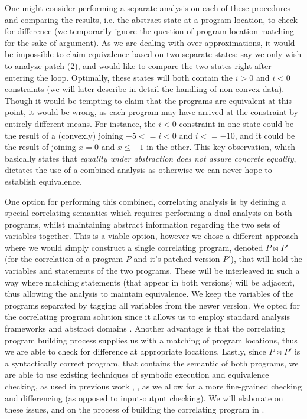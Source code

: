 One might consider performing a separate analysis on each of these procedures and comparing the results, i.e. the abstract state at a program location, to check for difference (we temporarily ignore the question of program location matching for the sake of argument). As we are dealing with over-approximations, it would be impossible to claim equivalence based on two separate states: say we only wish to analyze patch (2), and would like to compare the two states right after entering the loop. Optimally, these states will both contain the ${i > 0}$ and ${i < 0}$ constraints (we will later describe in detail the handling of non-convex data). Though it would be tempting to claim that the programs are equivalent at this point, it would be wrong, as each program may have arrived at the constraint by entirely different means. For instance, the ${i < 0}$ constraint in one state could be the result of a (convexly) joining ${-5<=i<0}$ and ${i<=-10}$, and it could be the result of joining ${x=0}$ and ${x \leq -1}$ in the other. This key observation, which basically states that \emph{equality under abstraction does not assure concrete equality}, dictates the use of a combined analysis as otherwise we can never hope to establish equivalence.

One option for performing this combined, correlating analysis is by defining a special correlating semantics which requires performing a dual analysis on both programs, whilst maintaining abstract information regarding the two sets of variables together. This is a viable option, however we chose a different approach where we would simply construct a single correlating program, denoted $P \bowtie P'$ (for the correlation of a program $P$ and it's patched version $P'$), that will hold the variables and statements of the two programs. These will be interleaved in such a way where matching statements (that appear in both versions) will be adjacent, thus allowing the analysis to maintain equivalence. We keep the variables of the programs separated by tagging all variables from the newer version. We opted for the correlating program solution since it allows us to employ standard analysis frameworks \cite{CLang} and abstract domains \cite{JeannetMine09}. Another advantage is that the correlating program building process supplies us with a matching of program locations, thus we are able to check for difference at appropriate locations. Lastly, since $P \bowtie P'$ is a syntactically correct program, that contains the semantic of both programs, we are able to use existing techniques of symbolic execution and equivalence checking, as used in previous work \cite{GodlinStrichman09,DwyerElbaumPerson08,EnglerRamos11}, , as we allow for a more fine-grained checking and differencing (as opposed to input-output checking). We will elaborate on these issues, and on the process of building the correlating program in .

